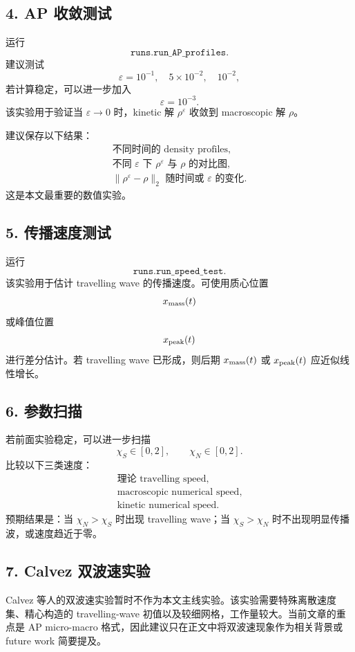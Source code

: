 \subsection*{4. AP 收敛测试}

运行
\[
\texttt{runs.run\_AP\_profiles}.
\]
建议测试
\[
\varepsilon=10^{-1},\quad 5\times 10^{-2},\quad 10^{-2},
\]
若计算稳定，可以进一步加入
\[
\varepsilon=10^{-3}.
\]
该实验用于验证当 \(\varepsilon\to0\) 时，kinetic 解 \(\rho^\varepsilon\) 收敛到 macroscopic 解 \(\rho\)。

建议保存以下结果：
\[
\begin{array}{l}
\text{不同时间的 density profiles},\\
\text{不同 } \varepsilon \text{ 下 } \rho^\varepsilon \text{ 与 } \rho \text{ 的对比图},\\
\|\rho^\varepsilon-\rho\|_2 \text{ 随时间或 } \varepsilon \text{ 的变化}.
\end{array}
\]
这是本文最重要的数值实验。

\subsection*{5. 传播速度测试}

运行
\[
\texttt{runs.run\_speed\_test}.
\]
该实验用于估计 travelling wave 的传播速度。可使用质心位置
\[
x_{\rm mass}(t)
\]
或峰值位置
\[
x_{\rm peak}(t)
\]
进行差分估计。若 travelling wave 已形成，则后期 \(x_{\rm mass}(t)\) 或 \(x_{\rm peak}(t)\) 应近似线性增长。

\subsection*{6. 参数扫描}

若前面实验稳定，可以进一步扫描
\[
\chi_S\in[0,2],\qquad \chi_N\in[0,2].
\]
比较以下三类速度：
\[
\begin{array}{l}
\text{理论 travelling speed},\\
\text{macroscopic numerical speed},\\
\text{kinetic numerical speed}.
\end{array}
\]
预期结果是：当 \(\chi_N>\chi_S\) 时出现 travelling wave；当 \(\chi_S>\chi_N\) 时不出现明显传播波，或速度趋近于零。

\subsection*{7. Calvez 双波速实验}

Calvez 等人的双波速实验暂时不作为本文主线实验。该实验需要特殊离散速度集、精心构造的 travelling-wave 初值以及较细网格，工作量较大。当前文章的重点是 AP micro-macro 格式，因此建议只在正文中将双波速现象作为相关背景或 future work 简要提及。

